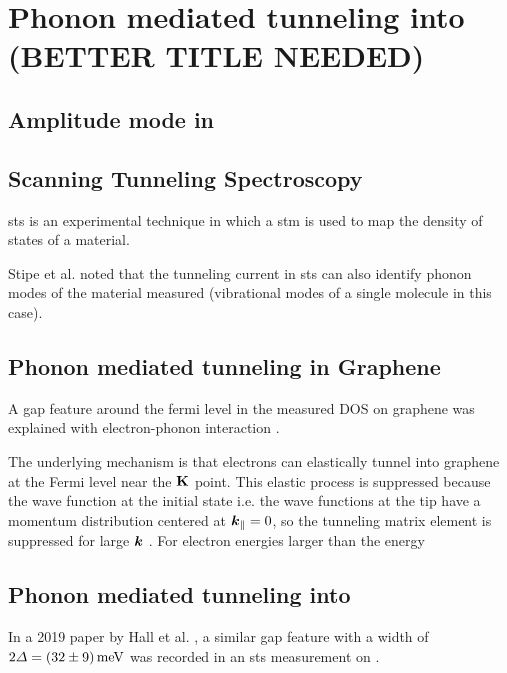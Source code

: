 \documentclass[main.tex]{subfiles}
\begin{document}
\chapter{Phonon mediated tunneling into \TaS (BETTER TITLE NEEDED)}\label{ch:sts_gap_tas2}

\section{Amplitude mode in \TaS}


\section{Scanning Tunneling Spectroscopy}

\acrfull{sts} is an experimental technique in which a \acrfull{stm} is used to map the density of states of a material.


Stipe et al. noted that the tunneling current in \acrshort{sts} can also identify phonon modes of the material measured \cite{stipe_single-molecule_1998} (vibrational modes of a single molecule in this case).

\section{Phonon mediated tunneling in Graphene}

A gap feature around the fermi level in the measured DOS on graphene \cite{zhang_giant_2008} was explained with electron-phonon interaction \cite{wehling_phonon-mediated_2008}.

The underlying mechanism is that electrons can elastically tunnel into graphene at the Fermi level near the \(\vb{K}\) point. 
This elastic process is suppressed because the wave function at the initial state i.e. the wave functions at the tip have a momentum distribution centered at \(\vb*{k}_{\parallel} = 0\), so the tunneling matrix element is suppressed for large \(\vb*{k}\) \cite{vitali_phonon_2004}.
For electron energies larger than the energy 

\section{Phonon mediated tunneling into \TaS}

In a 2019 paper by Hall et al. \cite{hall_environmental_2019}, a similar gap feature with a width of \(2 \Delta = \SI[separate-uncertainty = true]{32 \pm 9}{\milli\eV}\) was recorded in an \acrshort{sts} measurement on \TaS.
\end{document}
